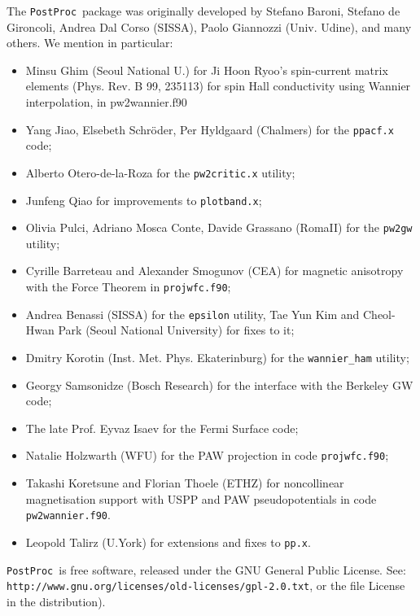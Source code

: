 \documentclass[12pt,a4paper]{article}
\def\PostProc{\texttt{PostProc}}
\begin{document}
The \PostProc\ package was originally developed by Stefano Baroni, 
Stefano de Gironcoli, Andrea Dal Corso (SISSA), Paolo Giannozzi 
(Univ. Udine), and many others. We mention in particular: 
\begin{itemize}
\item Minsu Ghim (Seoul National U.) for Ji Hoon Ryoo's spin-current matrix
      elements (Phys. Rev. B 99, 235113) for spin Hall conductivity using
      Wannier interpolation, in pw2wannier.f90
\item Yang Jiao, Elsebeth Schr\"oder, Per Hyldgaard (Chalmers) for the
  \texttt{ppacf.x} code;
\item Alberto Otero-de-la-Roza for the \texttt{pw2critic.x} utility;
\item Junfeng Qiao for improvements to \texttt{plotband.x};
\item Olivia Pulci, Adriano Mosca Conte, Davide Grassano (RomaII)
      for the \texttt{pw2gw} utility;
\item Cyrille Barreteau and Alexander Smogunov (CEA) for 
      magnetic anisotropy with the Force Theorem in \texttt{projwfc.f90};
\item Andrea Benassi (SISSA) for the \texttt{epsilon} utility,
      Tae Yun Kim and Cheol-Hwan Park (Seoul National University)
      for fixes to it;
\item Dmitry Korotin (Inst. Met. Phys. Ekaterinburg) for the
      \texttt{wannier\_ham} utility;
\item Georgy Samsonidze (Bosch Research) for the interface
      with the Berkeley GW code;
\item The late Prof. Eyvaz Isaev for the Fermi Surface code;
\item Natalie Holzwarth (WFU) for the PAW projection in code
     \texttt{projwfc.f90};
\item Takashi Koretsune and Florian Thoele (ETHZ) for noncollinear 
      magnetisation support with USPP and PAW pseudopotentials in 
      code \texttt{pw2wannier.f90}.
\item Leopold Talirz (U.York) for extensions and fixes to \texttt{pp.x}.
\end{itemize}

\PostProc\ is free software, released under the 
GNU General Public License. See:\\
\texttt{http://www.gnu.org/licenses/old-licenses/gpl-2.0.txt}, 
or the file License in the distribution).
    

\end{document}
